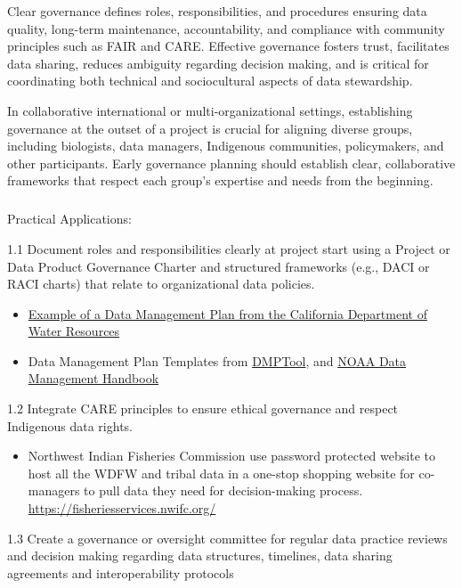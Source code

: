 \documentclass[
  letterpaper,
  DIV=11,
  numbers=noendperiod]{scrartcl}
\makeatletter
\let\oldsubparagraph\subparagraph
\renewcommand{\subparagraph}{
    \@ifstar
      \xxxSubParagraphStar
      \xxxSubParagraphNoStar
  }
\newcommand{\xxxSubParagraphStar}[1]{\oldsubparagraph*{#1}\mbox{}}
\newcommand{\xxxSubParagraphNoStar}[1]{\oldsubparagraph{#1}\mbox{}}
\providecommand{\tightlist}{%
  \setlength{\itemsep}{0pt}\setlength{\parskip}{0pt}}\usepackage{longtable,booktabs,array}
\makeatother
\begin{document}
Clear governance defines roles, responsibilities, and procedures
ensuring data quality, long-term maintenance, accountability, and
compliance with community principles such as FAIR and CARE. Effective
governance fosters trust, facilitates data sharing, reduces ambiguity
regarding decision making, and is critical for coordinating both
technical and sociocultural aspects of data stewardship.

In collaborative international or multi-organizational settings,
establishing governance at the outset of a project is crucial for
aligning diverse groups, including biologists, data managers, Indigenous
communities, policymakers, and other participants. Early governance
planning should establish clear, collaborative frameworks that respect
each group's expertise and needs from the beginning.~

\subparagraph{Practical Applications:}\label{practical-applications}

1.1 Document roles and responsibilities clearly at project start using a
Project or Data Product Governance Charter and structured frameworks
(e.g., DACI or RACI charts) that relate to organizational data policies.

\begin{itemize}
\item
  \href{https://raw.githubusercontent.com/Br-Johnson/sdm-paper/refs/heads/main/examples/Cal_DMP.pdf}{Example
  of a Data Management Plan from the California Department of Water
  Resources}
\item
  Data Management Plan Templates from
  \href{https://dmptool.org/public_templates?page=ALL}{DMPTool}, and
  \href{https://www.noaa.gov/sites/default/files/2025-03/NAO_212-15B_-_Data_Management_Handbook.pdf}{NOAA
  Data Management Handbook}
\end{itemize}

1.2 Integrate CARE principles to ensure ethical governance and respect
Indigenous data rights.

\begin{itemize}
\tightlist
\item
  Northwest Indian Fisheries Commission use password protected website
  to host all the WDFW and tribal data in a one-stop shopping website
  for co-managers to pull data they need for decision-making process.
  \url{https://fisheriesservices.nwifc.org/}
\end{itemize}

1.3 Create a governance or oversight committee for regular data practice
reviews and decision making regarding data structures, timelines, data
sharing agreements and interoperability protocols
\end{document}
